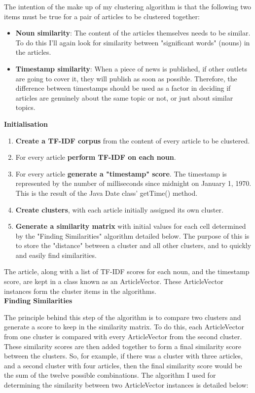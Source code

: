 \documentclass[12pt]{article}
\begin{document}
The intention of the make up of my clustering algorithm is that the following two items must be true for a pair of articles to be clustered together: \\

\begin{itemize}
	\item \textbf{Noun similarity}: The content of the articles themselves needs to be similar. To do this I'll again look for similarity between "significant words" (nouns) in the articles. 
	\item \textbf{Timestamp similarity}: When a piece of news is published, if other outlets are going to cover it, they will publish as soon as possible. Therefore, the difference between timestamps should be used as a factor in deciding if articles are genuinely about the same topic or not, or just about similar topics. 
\end{itemize}

\textbf{Initialisation}

\begin{enumerate}
	\item \textbf{Create a TF-IDF corpus} from the content of every article to be clustered. 
	\item For every article \textbf{perform TF-IDF on each noun}. 
	\item For every article \textbf{generate a "timestamp" score}. The timestamp is represented by the number of milliseconds since midnight on January 1, 1970. This is the result of the Java Date class' getTime() method.
	\item \textbf{Create clusters}, with each article initially assigned its own cluster. 
	\item \textbf{Generate a similarity matrix} with initial values for each cell determined by the "Finding Similarities" algorithm detailed below. The purpose of this is to store the "distance" between a cluster and all other clusters, and to quickly and easily find similarities. 
\end{enumerate}

The article, along with a list of TF-IDF scores for each noun, and the timestamp score, are kept in a class known as an ArticleVector. These ArticleVector instances form the cluster items in the algorithms. \\

\textbf{Finding Similarities}

The principle behind this step of the algorithm is to compare two clusters and generate a score to keep in the similarity matrix. To do this, each ArticleVector from one cluster is compared with every ArticleVector from the second cluster. These similarity scores are then added together to form a final similarity score between the clusters. So, for example, if there was a cluster with three articles, and a second cluster with four articles, then the final similarity score would be the sum of the twelve possible combinations. The algorithm I used for determining the similarity between two ArticleVector instances is detailed below: \\
\end{document}
